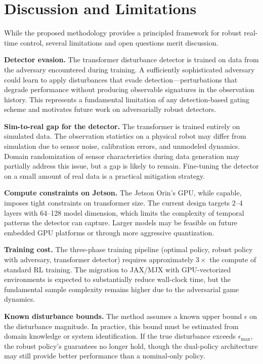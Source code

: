 \documentclass[conference]{IEEEtran}
\begin{document}
\section{Discussion and Limitations}\label{sec:discussion}

While the proposed methodology provides a principled framework for robust
real-time control, several limitations and open questions merit discussion.

\textbf{Detector evasion.}  The transformer disturbance detector is
trained on data from the adversary encountered during training.  A
sufficiently sophisticated adversary could learn to apply disturbances
that evade detection---perturbations that degrade performance without
producing observable signatures in the observation history.  This
represents a fundamental limitation of any detection-based gating scheme
and motivates future work on adversarially robust detectors.

\textbf{Sim-to-real gap for the detector.}  The transformer is trained
entirely on simulated data.  The observation statistics on a physical
robot may differ from simulation due to sensor noise, calibration errors,
and unmodeled dynamics.  Domain randomization of sensor characteristics
during data generation may partially address this issue, but a gap is
likely to remain.  Fine-tuning the detector on a small amount of real
data is a practical mitigation strategy.

\textbf{Compute constraints on Jetson.}  The Jetson Orin's GPU, while
capable, imposes tight constraints on transformer size.  The current
design targets 2--4 layers with 64--128 model dimension, which limits
the complexity of temporal patterns the detector can capture.
Larger models may be feasible on future embedded GPU platforms or through
more aggressive quantization.

\textbf{Training cost.}  The three-phase training pipeline (optimal
policy, robust policy with adversary, transformer detector) requires
approximately $3\times$ the compute of standard RL training.  The
migration to JAX/MJX with GPU-vectorized environments is expected to
substantially reduce wall-clock time, but the fundamental sample
complexity remains higher due to the adversarial game dynamics.

\textbf{Known disturbance bounds.}  The method assumes a known upper
bound $\epsilon$ on the disturbance magnitude.  In practice, this bound
must be estimated from domain knowledge or system identification.  If
the true disturbance exceeds $\epsilon_{\max}$, the robust policy's
guarantees no longer hold, though the dual-policy architecture may still
provide better performance than a nominal-only policy.
\end{document}
